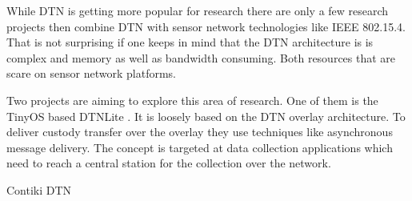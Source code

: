 While DTN is getting more popular for research there are only a few research
projects then combine DTN with sensor network technologies like IEEE 802.15.4.
That is not surprising if one keeps in mind that the DTN architecture is is
complex and memory as well as bandwidth consuming. Both resources that are scare
on sensor network platforms.

Two projects are aiming to explore this area of research. One of them is the
TinyOS based DTNLite \cite{dtnlite}. It is loosely based on the DTN overlay
architecture. To deliver custody transfer  over the overlay they use techniques
like asynchronous message delivery. The concept is targeted at data collection
applications which need to reach a central station for the collection over the
network.

Contiki DTN

